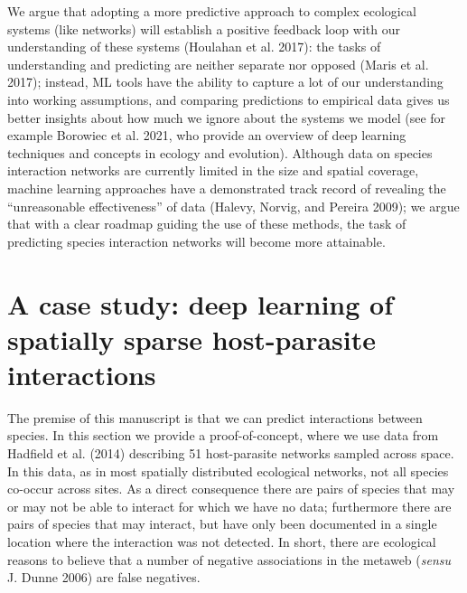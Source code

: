 \documentclass[10pt,oneside]{article}
\begin{document}
We argue that adopting a more predictive approach to complex ecological
systems (like networks) will establish a positive feedback loop with our
understanding of these systems (Houlahan et al. 2017): the tasks of
understanding and predicting are neither separate nor opposed (Maris et
al. 2017); instead, ML tools have the ability to capture a lot of our
understanding into working assumptions, and comparing predictions to
empirical data gives us better insights about how much we ignore about
the systems we model (see for example Borowiec et al. 2021, who provide
an overview of deep learning techniques and concepts in ecology and
evolution). Although data on species interaction networks are currently
limited in the size and spatial coverage, machine learning approaches
have a demonstrated track record of revealing the ``unreasonable
effectiveness'' of data (Halevy, Norvig, and Pereira 2009); we argue
that with a clear roadmap guiding the use of these methods, the task of
predicting species interaction networks will become more attainable.

\hypertarget{a-case-study-deep-learning-of-spatially-sparse-host-parasite-interactions}{%
\section{A case study: deep learning of spatially sparse host-parasite
interactions}\label{a-case-study-deep-learning-of-spatially-sparse-host-parasite-interactions}}

The premise of this manuscript is that we can predict interactions
between species. In this section we provide a proof-of-concept, where we
use data from Hadfield et al. (2014) describing 51 host-parasite
networks sampled across space. In this data, as in most spatially
distributed ecological networks, not all species co-occur across sites.
As a direct consequence there are pairs of species that may or may not
be able to interact for which we have no data; furthermore there are
pairs of species that may interact, but have only been documented in a
single location where the interaction was not detected. In short, there
are ecological reasons to believe that a number of negative associations
in the metaweb (\emph{sensu} J. Dunne 2006) are false negatives.
\end{document}
